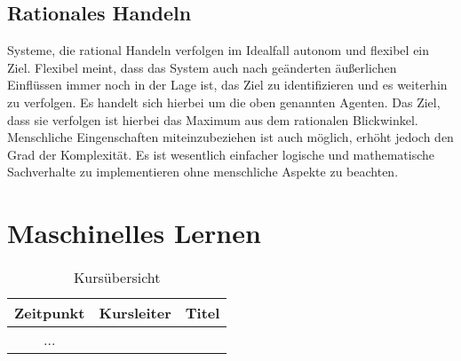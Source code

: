 \subsection{Rationales Handeln}
Systeme, die rational Handeln verfolgen im Idealfall autonom und flexibel ein Ziel. Flexibel meint, dass das System auch nach geänderten äußerlichen Einflüssen immer noch in der Lage ist, das Ziel zu identifizieren und es weiterhin zu verfolgen. Es handelt sich hierbei um die oben genannten Agenten. Das Ziel, dass sie verfolgen ist hierbei das Maximum aus dem rationalen Blickwinkel. Menschliche Eingenschaften miteinzubeziehen ist auch möglich, erhöht jedoch den Grad der Komplexität. Es ist wesentlich einfacher logische und mathematische Sachverhalte zu implementieren ohne menschliche Aspekte zu beachten.


\section{Maschinelles Lernen}

\begin{table}
\caption{ Kursübersicht}
\begin{tabular}{|c|c|c|}
\hline
Zeitpunkt & Kursleiter & Titel \\
\hline 
 ...   
\end{tabular}
\end{table}